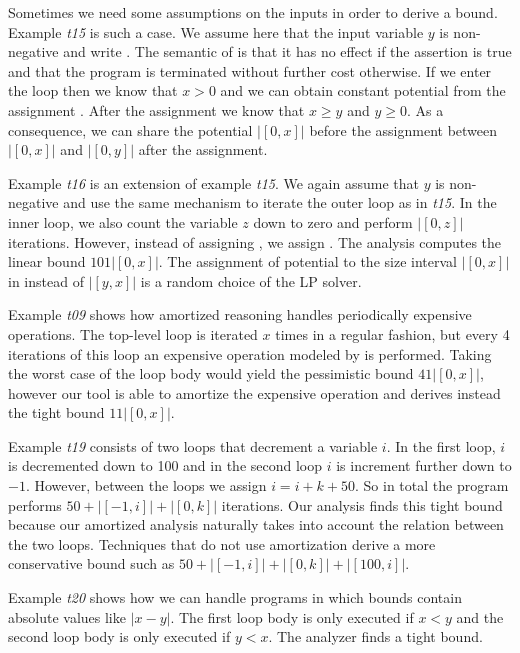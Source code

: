 \documentclass[nocopyrightspace,preprint,pldi]{sigplanconf-pldi15}
\newcommand{\iffull}[2]{\ifx\fullversion\undefined{#2}\else{#1}\fi}
\begin{document}
{Sometimes we need some assumptions on the inputs in order to derive a
bound.  Example \emph{t15} is such a case.  We assume here that the
input variable $y$ is non-negative and write .  The
semantic of  is that it has no effect if the assertion is
true and that the program is terminated without further cost
otherwise.  If we enter the loop then we know that $x>0$ and we can
obtain constant potential from the assignment .  After the
assignment we know that $x\geq y$ and $y\geq 0$.  As a consequence, we
can share the potential $|[0,x]|$ before the assignment 
between $|[0,x]|$ and $|[0,y]|$ after the assignment.  \iffull{In this way, we
derive a tight linear bound.}{}

Example \emph{t16} is an extension of example \emph{t15}. We again
assume that $y$ is non-negative and use the same mechanism to iterate
the outer loop as in \emph{t15}.  In the inner loop, we also count the
variable $z$ down to zero and perform $|[0,z]|$ iterations.  However,
instead of assigning , we assign .  The analysis
computes the linear bound $101|[0,x]|$.  The
assignment of potential to the size interval $|[0,x]|$ in instead of
$|[y,x]|$ is a random choice of the LP solver.

Example \emph{t09} shows how amortized reasoning handles periodically
expensive operations.  The top-level loop is iterated $x$ times in
a regular fashion, but every 4 iterations of this loop an expensive
operation modeled by  is performed.  Taking the worst
case of the loop body would yield the pessimistic bound $41|[0,x]|$,
however our tool is able to amortize the expensive operation and derives
instead the tight bound $11|[0,x]|$.

Example \emph{t19} consists of two loops that decrement a variable
$i$.  In the first loop, $i$ is decremented down to 100 and in the
second loop $i$ is increment further down to $-1$.  However, between
the loops we assign $i=i+k+50$.  So in total the program performs $50
+ |[-1,i]| + |[0,k]|$ iterations.  Our analysis finds this tight bound
because our amortized analysis naturally takes into account the
relation between the two loops.  Techniques that do not use
amortization derive a more conservative bound such as $50 + |[-1,i]| +
|[0,k]| + |[100,i]|$.

Example \emph{t20} shows how we can handle programs in which bounds
contain absolute values like $|x-y|$.  The first loop body is only
executed if $x<y$ and the second loop body is only executed if $y<x$.
The analyzer finds a tight bound.

}
\end{document}
